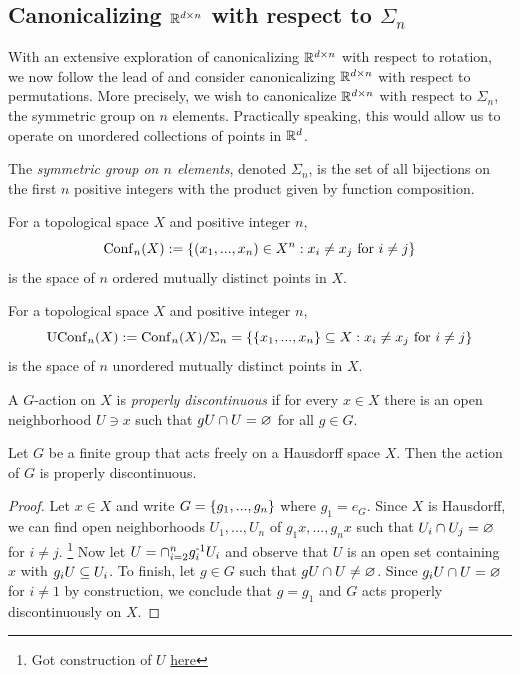 \subsection{Canonicalizing $\mathbb{R}^{d \times n}$ with respect to $\Sigma_n$}\label{sec:canonicalizing-matrices-permutations}
With an extensive exploration of canonicalizing $\mathbb{R}^{d \times n}$ with respect to rotation, we now follow the lead of \cite{dym2024equivariant} and consider canonicalizing $\mathbb{R}^{d \times n}$ with respect to permutations.
More precisely, we wish to canonicalize $\mathbb{R}^{d \times n}$ with respect to $\Sigma_n$, the symmetric group on $n$ elements.
Practically speaking, this would allow us to operate on unordered collections of points in $\mathbb{R}^d$.

\begin{definition}
    The \emph{symmetric group on $n$ elements}, denoted $\Sigma_n$, is the set of all bijections on the first $n$ positive integers with the product given by function composition.
\end{definition}

\begin{definition}
    For a topological space $X$ and positive integer $n$,
    \[
        \operatorname{Conf}_n(X) := \left\{ (x_1,...,x_n) \in X^n : x_i \neq x_j \text{ for } i \neq j \right\}
    \]
    is the space of $n$ ordered mutually distinct points in $X$.
\end{definition}

\begin{definition}
    For a topological space $X$ and positive integer $n$,
    \[
        \operatorname{UConf}_n(X) := \operatorname{Conf}_n(X) / \Sigma_n = \left\{ \left\{ x_1,...,x_n \right\} \subseteq X : x_i \neq x_j \text{ for } i \neq j \right\}
    \]
    is the space of $n$ unordered mutually distinct points in $X$.
\end{definition}

\begin{definition}
    A $G$-action on $X$ is \emph{properly discontinuous} if for every $x \in X$ there is an open neighborhood $U \ni x$ such that $g U \cap U = \varnothing$ for all $g \in G$.
\end{definition}

\begin{lemma}\label{lem:Hausdorff-free-prop-discont}
    Let $G$ be a finite group that acts freely on a Hausdorff space $X$.
    Then the action of $G$ is properly discontinuous.
    \begin{proof}
        Let $x \in X$ and write $G = \left\{ g_1,...,g_n \right\}$ where $g_1 = e_G$.
        Since $X$ is Hausdorff, we can find open neighborhoods $U_1,...,U_n$ of $g_1 x,...,g_n x$ such that $U_i \cap U_j = \varnothing$ for $i \neq j$.
        \footnote{Got construction of $U$ \href{https://math.stackexchange.com/questions/3172278/finite-group-action-on-hausdorff-space}{here}}
        Now let $U = \cap_{i=2}^n g_i^{\text{-}1} U_i$ and observe that $U$ is an open set containing $x$ with $g_i U \subseteq U_i$.
        To finish, let $g \in G$ such that $gU \cap U \neq \varnothing$.
        Since $g_i U \cap U = \varnothing$ for $i \neq 1$ by construction, we conclude that $g = g_1$ and $G$ acts properly discontinuously on $X$.
    \end{proof}
\end{lemma}

